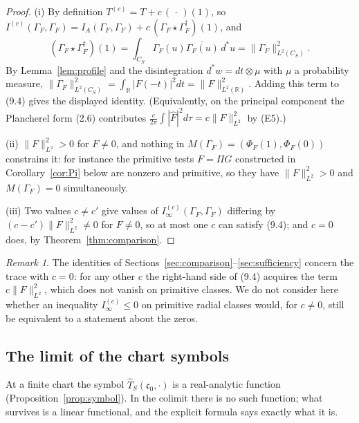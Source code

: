 \documentclass[11pt]{amsart}
\theoremstyle{definition}
\theoremstyle{remark}
\newtheorem{remark}[theorem]{Remark}
\newcommand{\R}{\mathbb R}
\newcommand{\CS}{C_S}
\newcommand{\cz}{\mathfrak c_0}
\begin{document}
\begin{proof}
(i)  By definition $T^{(c)}=T+c\,(\,\cdot\,)(1)$, so
$I^{(c)}(\Gamma_F,\Gamma_F)=I_A(\Gamma_F,\Gamma_F)
+c\,(\Gamma_F\star\Gamma_F^\dagger)(1)$, and
\[
  (\Gamma_F\star\Gamma_F^\dagger)(1)
  =\int_{\CS}\Gamma_F(u)\overline{\Gamma_F(u)}\,d^*u=\|\Gamma_F\|_{L^2(\CS)}^2 .
\]
By Lemma~\ref{lem:profile} and the disintegration $d^*w=dt\otimes\mu$ with
$\mu$ a probability measure,
$\|\Gamma_F\|_{L^2(\CS)}^2=\int_\R|F(-t)|^2dt=\|F\|_{L^2(\R)}^2$.  Adding this
term to (9.4) gives the displayed identity.  (Equivalently, on the principal
component the Plancherel form (2.6) contributes
$\frac c{2\pi}\int|\hat F|^2d\tau=c\|F\|_{L^2}^2$ by (E5).)

(ii)  $\|F\|_{L^2}^2>0$ for $F\ne0$, and nothing in
$M(\Gamma_F)=(\Phi_F(1),\Phi_F(0))$ constrains it: for instance the primitive
tests $F=\Pi G$ constructed in Corollary~\ref{cor:Pi} below are nonzero and
primitive, so they have $\|F\|_{L^2}^2>0$ and $M(\Gamma_F)=0$ simultaneously.

(iii)  Two values $c\ne c'$ give values of $I_\infty^{(c)}(\Gamma_F,\Gamma_F)$
differing by $(c-c')\|F\|_{L^2}^2\ne0$ for $F\ne0$, so at most one $c$ can
satisfy (9.4); and $c=0$ does, by Theorem~\ref{thm:comparison}.
\end{proof}

\begin{remark}
\label{rem:loadbearing}
The identities of Sections~\ref{sec:comparison}--\ref{sec:sufficiency} concern
the trace with $c=0$: for any other $c$ the right-hand side of (9.4) acquires
the term $c\|F\|_{L^2}^2$, which does not vanish on primitive classes.  We do
not consider here whether an inequality $I_\infty^{(c)}\le0$ on primitive
radial classes would, for $c\ne0$, still be equivalent to a statement about the
zeros.
\end{remark}

\subsection{The limit of the chart symbols}

At a finite chart the symbol $\widehat T_S(\cz,\cdot)$ is a
real-analytic function (Proposition~\ref{prop:symbol}).  In the colimit there
is no such function; what survives is a linear functional, and the explicit
formula says exactly what it is.
\end{document}
